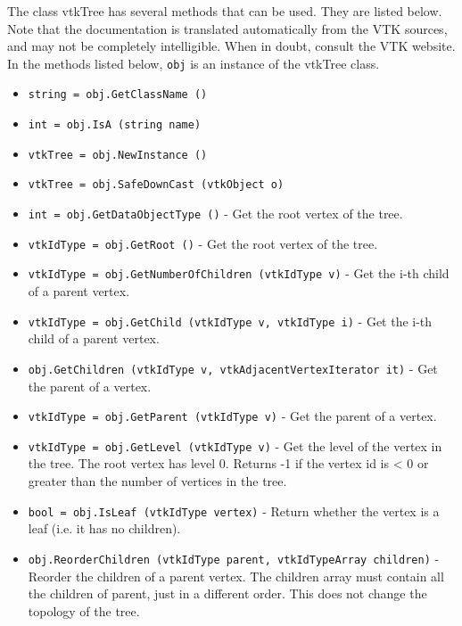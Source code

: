 The class vtkTree has several methods that can be used.
  They are listed below.
Note that the documentation is translated automatically from the VTK sources,
and may not be completely intelligible.  When in doubt, consult the VTK website.
In the methods listed below, \verb|obj| is an instance of the vtkTree class.
\begin{itemize}
\item  \verb|string = obj.GetClassName ()|

\item  \verb|int = obj.IsA (string name)|

\item  \verb|vtkTree = obj.NewInstance ()|

\item  \verb|vtkTree = obj.SafeDownCast (vtkObject o)|

\item  \verb|int = obj.GetDataObjectType ()| -  Get the root vertex of the tree.

\item  \verb|vtkIdType = obj.GetRoot ()| -  Get the root vertex of the tree.

\item  \verb|vtkIdType = obj.GetNumberOfChildren (vtkIdType v)| -  Get the i-th child of a parent vertex.

\item  \verb|vtkIdType = obj.GetChild (vtkIdType v, vtkIdType i)| -  Get the i-th child of a parent vertex.

\item  \verb|obj.GetChildren (vtkIdType v, vtkAdjacentVertexIterator it)| -  Get the parent of a vertex.

\item  \verb|vtkIdType = obj.GetParent (vtkIdType v)| -  Get the parent of a vertex.

\item  \verb|vtkIdType = obj.GetLevel (vtkIdType v)| -  Get the level of the vertex in the tree.  The root vertex has level 0.
 Returns -1 if the vertex id is < 0 or greater than the number of vertices
 in the tree.

\item  \verb|bool = obj.IsLeaf (vtkIdType vertex)| -  Return whether the vertex is a leaf (i.e. it has no children).

\item  \verb|obj.ReorderChildren (vtkIdType parent, vtkIdTypeArray children)| -  Reorder the children of a parent vertex.
 The children array must contain all the children of parent,
 just in a different order.
 This does not change the topology of the tree.

\end{itemize}
